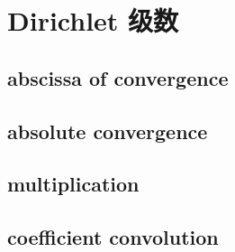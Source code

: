 \section{Dirichlet 级数}
\label{b3:sec:2504}


\subsection{abscissa of convergence}
\label{b3:subsec:250401}

\subsection{absolute convergence}
\label{b3:subsec:250402}

\subsection{multiplication}
\label{b3:subsec:250403}

\subsection{coefficient convolution}
\label{b3:subsec:250404}


